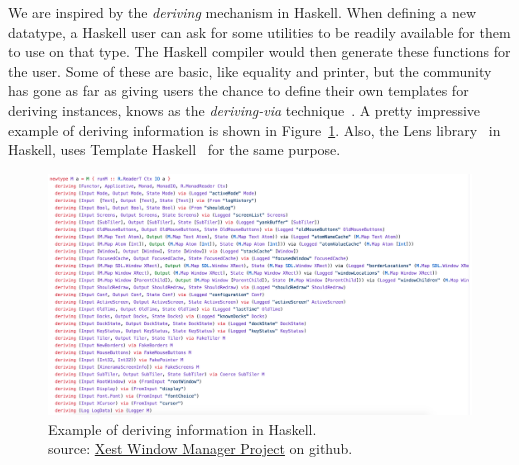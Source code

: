 We are inspired by the \emph{deriving} mechanism in Haskell. When defining a new datatype, a Haskell user can ask for some utilities to be readily available for them to use on that type. The Haskell compiler would then generate these functions for the user. Some of these are basic, like equality and printer, but the community has gone as far as giving users the chance to define their own templates for deriving instances, knows as the \emph{deriving-via} technique~\cite{loeh2018derivingVia}. A pretty impressive example of deriving information is shown in Figure~\ref{fig:deriving-via-example}. 
Also, the Lens library~\cite{lensesLib} in Haskell, uses Template Haskell~\cite{sheard2002TH} for the same purpose. 
\begin{figure}
    \includegraphics[scale=0.5,width=\linewidth]{figures/deriving-via-example.png}
    \caption{Example of deriving information in Haskell. \\ source: \href{https://github.com/jhgarner/Xest-Window-Manager/blob/3741b35a69eb2cf8cd7320e186fd40134d1c1a56/src/Base/DoAll.hs}{Xest Window Manager Project} on github.}
    \label{fig:deriving-via-example}
\end{figure}


